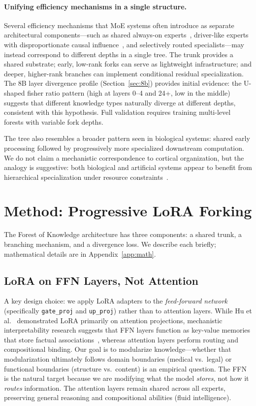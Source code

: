 \documentclass{article}
\newcommand{\tok}{Forest of Knowledge}
\begin{document}
\paragraph{Unifying efficiency mechanisms in a single structure.}
Several efficiency mechanisms that MoE systems often introduce as separate
architectural components---such as shared always-on
experts~\cite{deepseek2024moe}, driver-like experts with disproportionate
causal influence~\cite{domaindriver2026}, and selectively routed
specialists---may instead correspond to different depths in a single tree. The
trunk provides a shared substrate; early, low-rank forks can serve as
lightweight infrastructure; and deeper, higher-rank branches can implement
conditional residual specialization. The 8B layer divergence profile (Section~\ref{sec:8b}) provides initial
evidence: the U-shaped fisher ratio pattern (high at layers 0--4 and 24+,
low in the middle) suggests that different knowledge types naturally
diverge at different depths, consistent with this hypothesis. Full
validation requires training multi-level forests with variable fork depths.

The tree also resembles a broader pattern seen in biological systems: shared
early processing followed by progressively more specialized downstream
computation. We do not claim a mechanistic correspondence to cortical
organization, but the analogy is suggestive: both biological and artificial
systems appear to benefit from hierarchical specialization under resource
constraints~\cite{bena2025modularity}.

\section{Method: Progressive LoRA Forking}
\label{sec:method}

The \tok{} architecture has three components: a shared trunk, a branching
mechanism, and a divergence loss. We describe each briefly; mathematical details
are in Appendix~\ref{app:math}.

\subsection{LoRA on FFN Layers, Not Attention}

A key design choice: we apply LoRA adapters to the \emph{feed-forward network}
(specifically \texttt{gate\_proj} and \texttt{up\_proj}) rather than to
attention layers. While Hu et al.~\cite{hu2022lora} demonstrated LoRA
primarily on attention projections, mechanistic interpretability research
suggests that FFN layers function as key-value memories that store factual
associations~\cite{geva2021transformer}, whereas attention layers perform
routing and compositional binding. Our goal is to modularize knowledge---whether that modularization ultimately
follows domain boundaries (medical vs.\ legal) or functional boundaries
(structure vs.\ content) is an empirical question. The FFN is the natural
target because we are modifying what the model \emph{stores}, not how it
\emph{routes} information. The attention layers remain shared across all
experts, preserving general reasoning and compositional abilities (fluid
intelligence).
\end{document}
